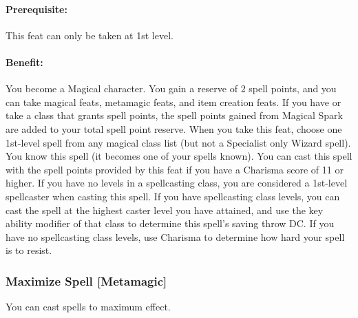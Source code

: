 \paragraph{Prerequisite:} This feat can only be taken at 1st level.

\paragraph{Benefit:}
You become a Magical character. You gain a reserve of 2 spell points, and you can take
magical feats, metamagic feats, and item creation feats.
If you have or take a class that grants spell points, the spell
points gained from Magical Spark are added to your total spell
point reserve.
When you take this feat, choose one 1st-level spell from any
magical class list (but not a Specialist only Wizard spell).
You know this spell (it becomes one of your
spells known). You can cast this spell with the spell
points provided by this feat if you have a Charisma score of 11
or higher. If you have no levels in a spellcasting class, you are considered
a 1st-level spellcaster when casting this spell. If you have
spellcasting class levels, you can cast the spell at the highest
caster level you have attained, and use the key ability modifier of that class to determine this spell's saving throw DC.
If you have no spellcasting class levels, use Charisma to determine how hard your spell is to resist.

\subsubsection[Maximize Spell]{Maximize Spell [Metamagic]}
\label{Feat:MaximizeSpell}
You can cast spells to maximum effect.

